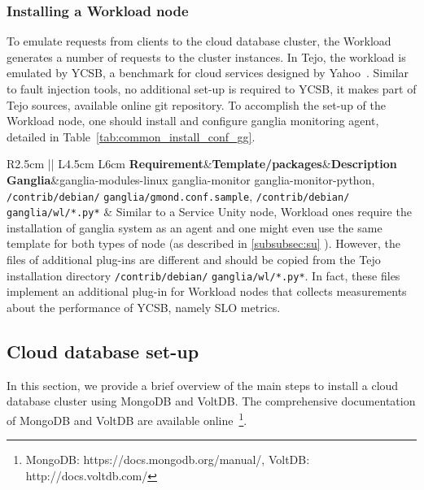 \subsubsection{Installing a Workload node}

To emulate requests from clients to the cloud database cluster, the Workload generates a number of requests to the cluster instances. In Tejo, the workload is emulated by YCSB, a benchmark for cloud services designed by Yahoo~\cite{cooper2010benchmarking}. Similar to fault injection tools, no additional set-up is required to YCSB, it makes part of Tejo sources, available online git repository. To accomplish the set-up of the Workload node, one should install and configure ganglia monitoring agent, detailed in Table~\ref{tab:common_install_conf_gg}. 

			\begin{table}[htdp]
				\begin{center}
\caption{Required packages and configuration file adjustments for a Service Unity node.}
  \label{tab:common_install_conf_gg}
					\begin{tabular}{R{2.5cm} || L{4.5cm} L{6cm} }
						{\bf Requirement}&{\bf Template/packages}&{\bf Description} \\  
						\hline
						\hline
						{\bf Ganglia}&ganglia-modules-linux ganglia-monitor ganglia-monitor-python, \verb|/contrib/debian/| \verb|ganglia/gmond.conf.sample|, \verb|/contrib/debian/| \verb|ganglia/wl/*.py*| & Similar to a Service Unity node, Workload ones require the installation of ganglia system as an agent and one might even use the same template for both types of node (as described in \ref{subsubsec:su} ). However, the files of additional plug-ins are different and should be copied from the Tejo installation directory \verb|/contrib/debian/| \verb|ganglia/wl/*.py*|. In fact, these files implement an additional plug-in for Workload nodes that collects measurements about the performance of YCSB, namely SLO metrics.\\
					\end{tabular}
				\end{center}
			\end{table}



\subsection{Cloud database set-up}
\label{subsec:dbsetup}

In this section, we provide a brief overview of the main steps to install a cloud database cluster using MongoDB and VoltDB. The comprehensive documentation of MongoDB and VoltDB are available online~\footnote{MongoDB: https://docs.mongodb.org/manual/, VoltDB: http://docs.voltdb.com/}.

